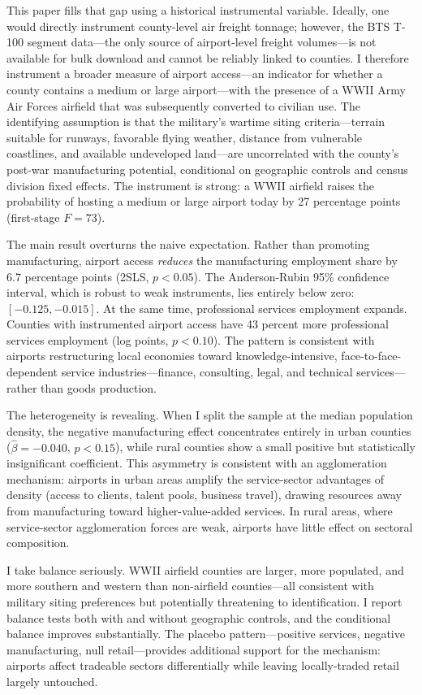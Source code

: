 \documentclass[12pt]{article}
\begin{document}
This paper fills that gap using a historical instrumental variable. Ideally, one would directly instrument county-level air freight tonnage; however, the BTS T-100 segment data---the only source of airport-level freight volumes---is not available for bulk download and cannot be reliably linked to counties. I therefore instrument a broader measure of airport access---an indicator for whether a county contains a medium or large airport---with the presence of a WWII Army Air Forces airfield that was subsequently converted to civilian use. The identifying assumption is that the military's wartime siting criteria---terrain suitable for runways, favorable flying weather, distance from vulnerable coastlines, and available undeveloped land---are uncorrelated with the county's post-war manufacturing potential, conditional on geographic controls and census division fixed effects. The instrument is strong: a WWII airfield raises the probability of hosting a medium or large airport today by 27 percentage points (first-stage $F = 73$).

The main result overturns the naive expectation. Rather than promoting manufacturing, airport access \emph{reduces} the manufacturing employment share by 6.7 percentage points (2SLS, $p < 0.05$). The Anderson-Rubin 95\% confidence interval, which is robust to weak instruments, lies entirely below zero: $[-0.125, -0.015]$. At the same time, professional services employment expands. Counties with instrumented airport access have 43 percent more professional services employment (log points, $p < 0.10$). The pattern is consistent with airports restructuring local economies toward knowledge-intensive, face-to-face-dependent service industries---finance, consulting, legal, and technical services---rather than goods production.

The heterogeneity is revealing. When I split the sample at the median population density, the negative manufacturing effect concentrates entirely in urban counties ($\hat{\beta} = -0.040$, $p < 0.15$), while rural counties show a small positive but statistically insignificant coefficient. This asymmetry is consistent with an agglomeration mechanism: airports in urban areas amplify the service-sector advantages of density (access to clients, talent pools, business travel), drawing resources away from manufacturing toward higher-value-added services. In rural areas, where service-sector agglomeration forces are weak, airports have little effect on sectoral composition.

I take balance seriously. WWII airfield counties are larger, more populated, and more southern and western than non-airfield counties---all consistent with military siting preferences but potentially threatening to identification. I report balance tests both with and without geographic controls, and the conditional balance improves substantially. The placebo pattern---positive services, negative manufacturing, null retail---provides additional support for the mechanism: airports affect tradeable sectors differentially while leaving locally-traded retail largely untouched.
\end{document}
